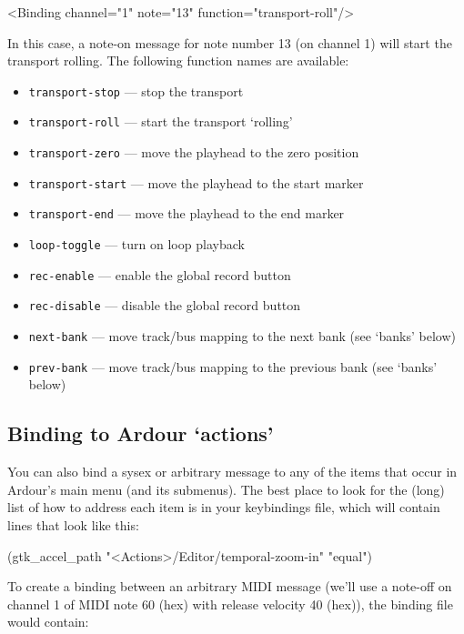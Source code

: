 \documentclass[10pt,a4paper]{book}
\begin{document}
\begin{listing}
<Binding channel="1" note="13" function="transport-roll"/>
\end{listing}

In this case, a note-on message for note number 13 (on channel 1) will
start the transport rolling. The following function names are
available:

\begin{itemize}
\item \texttt{transport-stop} --- stop the transport 
\item \texttt{transport-roll} --- start the transport `rolling'
\item \texttt{transport-zero} --- move the playhead to the zero position 
\item \texttt{transport-start} --- move the playhead to the start marker 
\item \texttt{transport-end} --- move the playhead to the end marker 
\item \texttt{loop-toggle} --- turn on loop playback 
\item \texttt{rec-enable} --- enable the global record button 
\item \texttt{rec-disable} --- disable the global record button 
\item \texttt{next-bank} --- move track/bus mapping to the next bank (see `banks' below) 
\item \texttt{prev-bank} --- move track/bus mapping to the previous bank (see `banks' below) 
\end{itemize}

\subsection{Binding to Ardour `actions'}

You can also bind a sysex or arbitrary message to any of the items
that occur in Ardour's main menu (and its submenus). The best place to
look for the (long) list of how to address each item is in your
keybindings file, which will contain lines that look like this:

\begin{listing}
(gtk\_accel\_path "<Actions>/Editor/temporal-zoom-in" "equal")
\end{listing}

To create a binding between an arbitrary MIDI message (we'll use a
note-off on channel 1 of MIDI note 60 (hex) with release velocity 40
(hex)), the binding file would contain:
\end{document}
